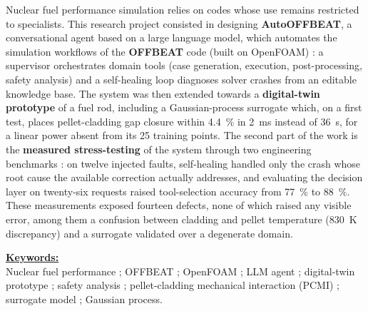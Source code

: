 \noindent
Nuclear fuel performance simulation relies on codes whose use remains
restricted to specialists. This research project consisted in designing
\textbf{AutoOFFBEAT}, a conversational agent based on a large language model,
which automates the simulation workflows of the \textbf{OFFBEAT} code (built on
OpenFOAM) : a supervisor orchestrates domain tools (case generation, execution,
post-processing, safety analysis) and a self-healing loop diagnoses solver
crashes from an editable knowledge base. The system was then extended towards a
\textbf{digital-twin prototype} of a fuel rod, including a Gaussian-process
surrogate which, on a first test, places pellet-cladding gap closure within
\SI{4.4}{\percent} in \SI{2}{\milli\second} instead of \SI{36}{\second},
for a linear power absent from its \num{25} training points. The second part of
the work is the \textbf{measured stress-testing} of the system through two
engineering benchmarks : on twelve injected faults, self-healing handled only
the crash whose root cause the available correction actually addresses, and
evaluating the decision layer on twenty-six requests raised tool-selection
accuracy from \SI{77}{\percent} to \SI{88}{\percent}. These measurements exposed
fourteen defects, none of which raised any visible error, among them a confusion
between cladding and pellet temperature (\SI{830}{\kelvin} discrepancy) and a
surrogate validated over a degenerate domain.

\vspace{0.35cm}
\noindent\textbf{\underline{Keywords:}}\\[2pt]
Nuclear fuel performance ; OFFBEAT ; OpenFOAM ; LLM agent ; digital-twin
prototype ;
safety analysis ; pellet-cladding mechanical interaction (PCMI) ;
surrogate model ; Gaussian process.

\vspace{0.55cm}

